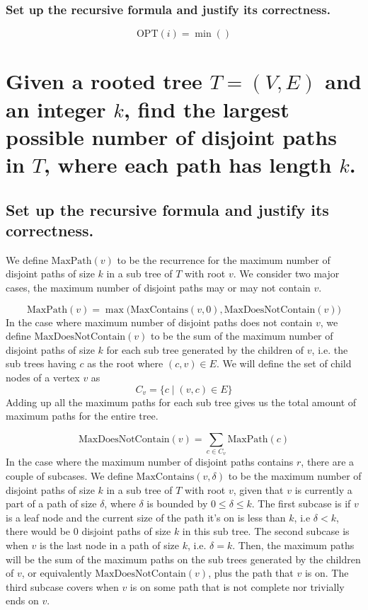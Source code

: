 \documentclass[11pt]{scrartcl}
\newcommand{\opt}{\text{OPT}}
\newcommand{\maxp}{\text{MaxPath}}
\newcommand{\ctn}{\text{MaxContains}}
\newcommand{\dctn}{\text{MaxDoesNotContain}}
\begin{document}
\subsubsection{
	Set up the recursive formula and justify its correctness.
}

$$
\opt(i) = \min()
$$






\section{
	Given a	rooted tree $T = (V, E)$ and an integer $k$, find the largest possible 
	number of disjoint paths in $T$, where each path has length $k$.
 }
\subsection{
	Set up the recursive formula and justify its correctness.
}
We define $\maxp(v)$ to be the recurrence for the maximum number of disjoint paths of size $k$ in a sub tree
of $T$ with root $v$. We consider two major cases, the maximum number of disjoint paths may or 
may not contain $v$. 

$$
\maxp(v) = \max \Big(\ctn(v, 0) , \dctn(v) \Big)
$$
In the case where maximum number of disjoint paths does not contain $v$, we define 
$\dctn(v)$ to be the sum of   
the maximum number of disjoint paths of size $k$ for each sub tree generated by the children of $v$, 
i.e. the sub trees having $c$ as the root where $(c,v) \in E$.
We will define the set of child nodes of a vertex $v$ as $$C_v = \Big\{c \mid (v,c) \in E\Big\}$$
Adding up all the maximum paths for each sub tree
gives us the total amount of maximum paths for the entire tree. 

$$
\dctn(v) = \sum_{c \in C_v } \maxp(c)
$$
In the case where the maximum number of disjoint paths contains $r$, there are a couple of subcases.
We define $\ctn(v,\delta)$ to be the maximum number of disjoint paths of size $k$
in a sub tree of $T$ with root $v$, given that 
$v$ is currently a part of a path of size $\delta$, where $\delta$ is bounded by $0 \leq \delta \leq k$.
The first subcase is if $v$ is a leaf node and the current size of the path it's on is less than $k$, 
i.e $\delta < k$, there would be $0$ disjoint paths of size $k$ in this sub tree. 
The second subcase is when $v$ is the last node in a path of size $k$, i.e. $\delta = k$. Then, the 
maximum paths will be the sum of the maximum paths on the sub trees generated by the children of 
$v$, or equivalently $\dctn(v)$, plus the path that $v$ is on.  
The third subcase covers when $v$ is on some path that is not complete nor trivially ends on $v$.
\end{document}
